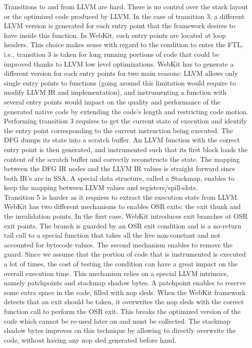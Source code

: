 Transitions to and from LLVM are hard. 
There is no control over the stack layout or the optimized code produced by LLVM.
In the case of transition 3, a different LLVM version is generated for each entry point that the framework desires to have inside this function.
In WebKit, such entry points are located at loop headers. 
This choice makes sense with regard to the condition to enter the FTL, i.e., transition 3 is taken for long running portions of code that could be improved thanks to LLVM low level optimizations.
WebKit has to generate a different version for each entry points for two main reasons: LLVM allows only single entry points to functions (going around this limitation would require to modify LLVM IR and implementation), and instrumenting a function with several entry points would impact on the quality and performance of the generated native code by extending the code's length and restricting code motion.\\

Performing transition 3 requires to get the current state of execution and identify the entry point corresponding to the current instruction being executed.
The DFG dumps its state into a scratch buffer.
An LLVM function with the correct entry point is then generated, and instrumented such that its first block loads the content of the scratch buffer and correctly reconstructs the state.
The mapping between the DFG IR nodes and the LLVM IR values is straight forward since both IR's are in SSA.
A special data structure, called a Stackmap, enables to keep the mapping between LLVM values and registers/spill-slots.\\

Transition 5 is harder as it requires to extract the execution state from LLVM.
WebKit has two different mechanisms to enables OSR exits: the exit thunk and the invalidation points.
In the first case, WebKit introduces exit branches at OSR exit points.
The branch is guarded by an OSR exit condition and is a no-return tail call to a special function that takes all the live non-constant and not accounted for bytecode values.
The second mechanism enables to remove the guard.
Since we assume that the portion of code that is instrumented is executed a lot of times, the cost of testing the condition can have a great impact on the overall execution time.
This mechanism relies on a special LLVM intrinsics, namely patchpoints and stackmap shadow bytes.
A patchpoint enables to reserve some extra space in the code, filled with nop sleds. 
When the WebKit framework detects that an exit should be taken, it overwrites the nop sleds with the correct function call to perform the OSR exit.
This breaks the optimized version of the code which cannot be re-used later on and must be collected.
The stackmap shadow bytes improves on this technique by allowing to directly overwrite the code, without having any nop sled generated before hand.

